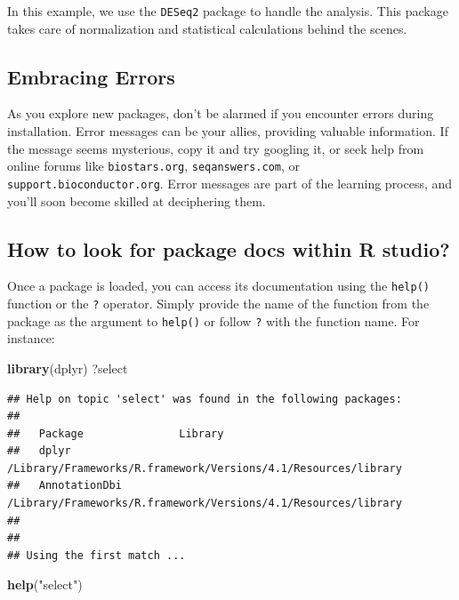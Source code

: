 \documentclass[
]{book}
\newenvironment{Shaded}{\begin{snugshade}}{\end{snugshade}}
\newcommand{\FunctionTok}[1]{\textcolor[rgb]{0.13,0.29,0.53}{\textbf{#1}}}
\newcommand{\NormalTok}[1]{#1}
\newcommand{\StringTok}[1]{\textcolor[rgb]{0.31,0.60,0.02}{#1}}
\begin{document}
In this example, we use the \texttt{DESeq2} package to handle the analysis. This package takes care of normalization and statistical calculations behind the scenes.

\hypertarget{embracing-errors}{%
\subsection{Embracing Errors}\label{embracing-errors}}

As you explore new packages, don't be alarmed if you encounter errors during installation. Error messages can be your allies, providing valuable information. If the message seems mysterious, copy it and try googling it, or seek help from online forums like \texttt{biostars.org}, \texttt{seqanswers.com}, or \texttt{support.bioconductor.org}. Error messages are part of the learning process, and you'll soon become skilled at deciphering them.

\hypertarget{how-to-look-for-package-docs-within-r-studio}{%
\subsection{How to look for package docs within R studio?}\label{how-to-look-for-package-docs-within-r-studio}}

Once a package is loaded, you can access its documentation using the \texttt{help()} function or the \texttt{?} operator. Simply provide the name of the function from the package as the argument to \texttt{help()} or follow \texttt{?} with the function name. For instance:

\begin{Shaded}
\begin{Highlighting}[]
\FunctionTok{library}\NormalTok{(dplyr)}
\NormalTok{?select}
\end{Highlighting}
\end{Shaded}

\begin{verbatim}
## Help on topic 'select' was found in the following packages:
## 
##   Package               Library
##   dplyr                 /Library/Frameworks/R.framework/Versions/4.1/Resources/library
##   AnnotationDbi         /Library/Frameworks/R.framework/Versions/4.1/Resources/library
## 
## 
## Using the first match ...
\end{verbatim}

\begin{Shaded}
\begin{Highlighting}[]
\FunctionTok{help}\NormalTok{(}\StringTok{"select"}\NormalTok{)}
\end{Highlighting}
\end{Shaded}
\end{document}
